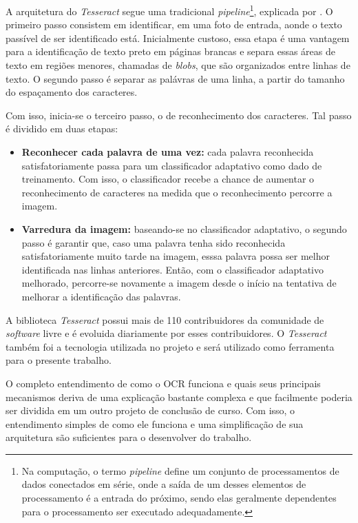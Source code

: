 A arquitetura do \textit{Tesseract} segue uma tradicional \textit{pipeline}\footnote{
  Na computação, o termo \textit{pipeline} define um conjunto de processamentos de dados conectados em série, onde a saída de um desses elementos de processamento é a entrada do próximo, sendo elas geralmente dependentes para o processamento ser executado adequadamente.
}, explicada por . O primeiro passo consistem em identificar, em uma foto de entrada, aonde o texto passível de ser identificado está. Inicialmente custoso, essa etapa é uma vantagem para a identificação de texto preto em páginas brancas e separa essas áreas de texto em regiões menores, chamadas de \textit{blobs}, que são organizados entre linhas de texto. O segundo passo é separar as palávras de uma linha, a partir do tamanho do espaçamento dos caracteres.

Com isso, inicia-se o terceiro passo, o de reconhecimento dos caracteres. Tal passo é dividido em duas etapas:

\begin{itemize}
  \item \textbf{Reconhecer cada palavra de uma vez:} cada palavra reconhecida satisfatoriamente passa para um classificador adaptativo como dado de treinamento. Com isso, o classificador recebe a chance de aumentar o reconhecimento de caracteres na medida que o reconhecimento percorre a imagem.
  \item \textbf{Varredura da imagem:} baseando-se no classificador adaptativo, o segundo passo é garantir que, caso uma palavra tenha sido reconhecida satisfatoriamente muito tarde na imagem, esssa palavra possa ser melhor identificada nas linhas anteriores. Então, com o classificador adaptativo melhorado, percorre-se novamente a imagem desde o início na tentativa de melhorar a identificação das palavras.
\end{itemize}

A biblioteca \textit{Tesseract} possui mais de 110 contribuidores da comunidade de \textit{software} livre e é evoluida diariamente por esses contribuidores. O \textit{Tesseract} também foi a tecnologia utilizada no projeto  e será utilizado como ferramenta para o presente trabalho.

\ornament

O completo entendimento de como o OCR funciona e quais seus principais mecanismos deriva de uma explicação bastante complexa e que facilmente poderia ser dividida em um outro projeto de conclusão de curso. Com isso, o entendimento simples de como ele funciona e uma simplificação de sua arquitetura são suficientes para o desenvolver do trabalho.


